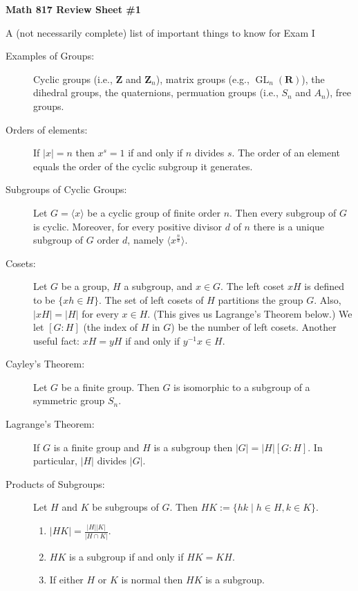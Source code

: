 \documentclass[12pt]{article}
\begin{document}

\centerline{{\bf Math 817 Review Sheet \#1}}
\smallskip
\centerline{{A (not necessarily complete) list of important things to know for Exam I}}

\begin{description}

\item[Examples of Groups:]  Cyclic groups (i.e., $\mathbf Z$ and $\mathbf Z_n$), matrix groups (e.g., $\operatorname{GL}_n(\mathbf R)$), the dihedral groups,
the quaternions, permuation groups (i.e., $S_n$ and $A_n$), free groups.

\item[Orders of elements:] If $|x|=n$ then $x^s=1$ if and only if $n$ divides $s$.  The order of an element equals the order of the cyclic subgroup it generates.

\item[Subgroups of Cyclic Groups:]Let $G=\langle x\rangle$ be a cyclic group of finite order $n$.  Then every subgroup of $G$ is cyclic.  Moreover, for every positive divisor $d$ of $n$ there is a unique subgroup of $G$ order $d$, namely $\langle x^{\frac{n}{d}} \rangle$.

\item[Cosets:]  Let $G$ be a group, $H$ a subgroup, and $x\in G$.  The left coset $xH$ is defined to be $\{xh\in H\}$.   The set of left cosets of $H$ partitions the group $G$.  Also, $|xH|=|H|$ for every $x\in H$.  (This gives us Lagrange's Theorem below.)  We let $[G:H]$ (the index of $H$ in $G$) be the number of left cosets.  Another useful fact: $xH=yH$ if and only if $y^{-1}x\in H$.

\item[Cayley's Theorem:]  Let $G$ be a finite group. Then $G$ is isomorphic to a subgroup of a symmetric group $S_n$.

\item[Lagrange's Theorem:]  If $G$ is a finite group and $H$ is a subgroup then $|G|=|H|[G:H]$.  In particular, $|H|$ divides $|G|$.

\item[Products of Subgroups:] Let $H$ and $K$ be subgroups of $G$.  Then ${HK:=\{hk\mid h\in H, k\in K\}}$.   
\begin{enumerate}
\item $|HK|=\frac{|H||K|}{|H\cap K|}$.  
\item $HK$ is a subgroup if and only if $HK=KH$.
\item If either $H$ or $K$ is normal then $HK$ is a subgroup.
\end{enumerate}



\end{description}
\end{document}
